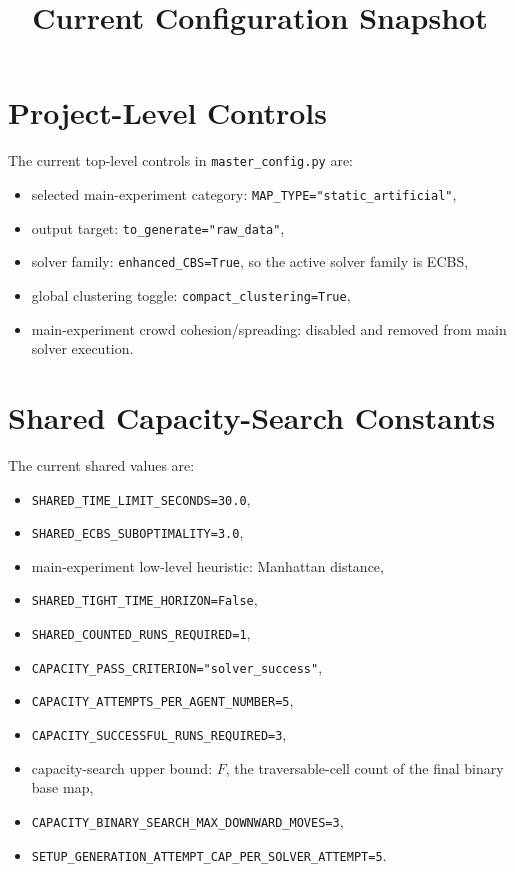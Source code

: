 \documentclass[11pt]{article}
\title{Current Configuration Snapshot}
\author{}
\date{}
\begin{document}
\maketitle

\section{Project-Level Controls}

The current top-level controls in \texttt{master\_config.py} are:
\begin{itemize}[leftmargin=2em]
    \item selected main-experiment category: \texttt{MAP\_TYPE="static\_artificial"},
    \item output target: \texttt{to\_generate="raw\_data"},
    \item solver family: \texttt{enhanced\_CBS=True}, so the active solver family is ECBS,
    \item global clustering toggle: \texttt{compact\_clustering=True},
    \item main-experiment crowd cohesion/spreading: disabled and removed from main solver execution.
\end{itemize}

\section{Shared Capacity-Search Constants}

The current shared values are:
\begin{itemize}[leftmargin=2em]
    \item \texttt{SHARED\_TIME\_LIMIT\_SECONDS=30.0},
    \item \texttt{SHARED\_ECBS\_SUBOPTIMALITY=3.0},
    \item main-experiment low-level heuristic: Manhattan distance,
    \item \texttt{SHARED\_TIGHT\_TIME\_HORIZON=False},
    \item \texttt{SHARED\_COUNTED\_RUNS\_REQUIRED=1},
    \item \texttt{CAPACITY\_PASS\_CRITERION="solver\_success"},
    \item \texttt{CAPACITY\_ATTEMPTS\_PER\_AGENT\_NUMBER=5},
    \item \texttt{CAPACITY\_SUCCESSFUL\_RUNS\_REQUIRED=3},
    \item capacity-search upper bound: $F$, the traversable-cell count of the final binary base map,
    \item \texttt{CAPACITY\_BINARY\_SEARCH\_MAX\_DOWNWARD\_MOVES=3},
    \item \texttt{SETUP\_GENERATION\_ATTEMPT\_CAP\_PER\_SOLVER\_ATTEMPT=5}.
\end{itemize}
\end{document}
